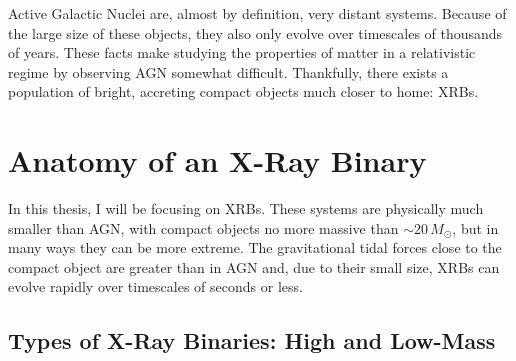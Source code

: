 \par Active Galactic Nuclei are, almost by definition, very distant systems.  Because of the large size of these objects, they also only evolve over timescales of thousands of years.  These facts make studying the properties of matter in a relativistic regime by observing AGN somewhat difficult.  Thankfully, there exists a population of bright, accreting compact objects much closer to home: XRBs.

\section{Anatomy of an X-Ray Binary}

\par In this thesis, I will be focusing on XRBs.  These systems are physically much smaller than AGN, with compact objects no more massive than $\sim20\,M_\odot$, but in many ways they can be more extreme.  The gravitational tidal forces close to the compact object are greater than in AGN and, due to their small size, XRBs can evolve rapidly over timescales of seconds or less.

\subsection{Types of X-Ray Binaries: High and Low-Mass}

